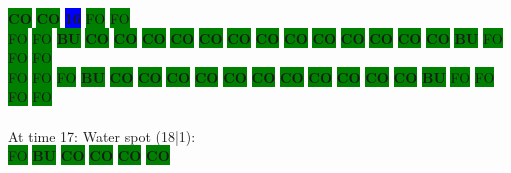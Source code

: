\colorbox{green}{\color[rgb]{0,0,0}\textbf{CO}}%
\colorbox{green}{\color[rgb]{0,0,0}\textbf{CO}}%
\colorbox{blue}{\color[rgb]{1,0,0}\textbf{16}}%
\colorbox{green}{\color[gray]{0.75}FO}%
\colorbox{green}{\color[gray]{0.75}FO}%
\\
\colorbox{green}{\color[gray]{0.75}FO}%
\colorbox{green}{\color[gray]{0.75}FO}%
\colorbox{green}{\color[rgb]{1,0,0}\textbf{BU}}%
\colorbox{green}{\color[rgb]{0,0,0}\textbf{CO}}%
\colorbox{green}{\color[rgb]{0,0,0}\textbf{CO}}%
\colorbox{green}{\color[rgb]{0,0,0}\textbf{CO}}%
\colorbox{green}{\color[rgb]{0,0,0}\textbf{CO}}%
\colorbox{green}{\color[rgb]{0,0,0}\textbf{CO}}%
\colorbox{green}{\color[rgb]{0,0,0}\textbf{CO}}%
\colorbox{green}{\color[rgb]{0,0,0}\textbf{CO}}%
\colorbox{green}{\color[rgb]{0,0,0}\textbf{CO}}%
\colorbox{green}{\color[rgb]{0,0,0}\textbf{CO}}%
\colorbox{green}{\color[rgb]{0,0,0}\textbf{CO}}%
\colorbox{green}{\color[rgb]{0,0,0}\textbf{CO}}%
\colorbox{green}{\color[rgb]{0,0,0}\textbf{CO}}%
\colorbox{green}{\color[rgb]{0,0,0}\textbf{CO}}%
\colorbox{green}{\color[rgb]{1,0,0}\textbf{BU}}%
\colorbox{green}{\color[gray]{0.75}FO}%
\colorbox{green}{\color[gray]{0.75}FO}%
\colorbox{green}{\color[gray]{0.75}FO}%
\\
\colorbox{green}{\color[gray]{0.75}FO}%
\colorbox{green}{\color[gray]{0.75}FO}%
\colorbox{green}{\color[gray]{0.75}FO}%
\colorbox{green}{\color[rgb]{1,0,0}\textbf{BU}}%
\colorbox{green}{\color[rgb]{0,0,0}\textbf{CO}}%
\colorbox{green}{\color[rgb]{0,0,0}\textbf{CO}}%
\colorbox{green}{\color[rgb]{0,0,0}\textbf{CO}}%
\colorbox{green}{\color[rgb]{0,0,0}\textbf{CO}}%
\colorbox{green}{\color[rgb]{0,0,0}\textbf{CO}}%
\colorbox{green}{\color[rgb]{0,0,0}\textbf{CO}}%
\colorbox{green}{\color[rgb]{0,0,0}\textbf{CO}}%
\colorbox{green}{\color[rgb]{0,0,0}\textbf{CO}}%
\colorbox{green}{\color[rgb]{0,0,0}\textbf{CO}}%
\colorbox{green}{\color[rgb]{0,0,0}\textbf{CO}}%
\colorbox{green}{\color[rgb]{0,0,0}\textbf{CO}}%
\colorbox{green}{\color[rgb]{1,0,0}\textbf{BU}}%
\colorbox{green}{\color[gray]{0.75}FO}%
\colorbox{green}{\color[gray]{0.75}FO}%
\colorbox{green}{\color[gray]{0.75}FO}%
\colorbox{green}{\color[gray]{0.75}FO}%
\\
\\
At time 17: Water spot (18|1):
\\
\colorbox{green}{\color[gray]{0.75}FO}%
\colorbox{green}{\color[rgb]{1,0,0}\textbf{BU}}%
\colorbox{green}{\color[rgb]{0,0,0}\textbf{CO}}%
\colorbox{green}{\color[rgb]{0,0,0}\textbf{CO}}%
\colorbox{green}{\color[rgb]{0,0,0}\textbf{CO}}%
\colorbox{green}{\color[rgb]{0,0,0}\textbf{CO}}%
